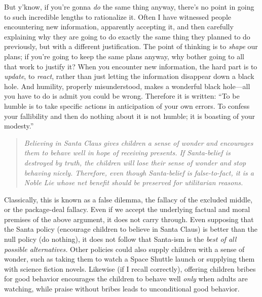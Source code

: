 {
 But y'know, if you're gonna
\textit{do} the same thing anyway, there's no point in
going to such incredible lengths to rationalize it. Often I have
witnessed people encountering new information, apparently accepting it,
and then carefully explaining why they are going to do exactly the same
thing they planned to do previously, but with a different
justification. The point of thinking is to \textit{shape} our plans; if
you're going to keep the same plans anyway, why bother
going to all that work to justify it? When you encounter new
information, the hard part is to \textit{update}, to \textit{react},
rather than just letting the information disappear down a black hole.
And humility, properly misunderstood, makes a wonderful black
hole---all you have to do is admit you could be wrong. Therefore it is
written: ``To be humble is to take specific actions in
anticipation of your own errors. To confess your fallibility and then
do nothing about it is not humble; it is boasting of your
modesty.''}

\myendsectiontext


\bigskip



\begin{quote}
{
 \textit{Believing in Santa Claus gives children a sense of wonder
and encourages them to behave well in hope of receiving presents. If
Santa-belief is destroyed by truth, the children will lose their sense
of wonder and stop behaving nicely. Therefore, even though Santa-belief
is false-to-fact, it is a Noble Lie whose net benefit should be
preserved for utilitarian reasons.}}
\end{quote}

{
 Classically, this is known as a false dilemma, the fallacy of the
excluded middle, or the package-deal fallacy. Even if we accept the
underlying factual and moral premises of the above argument, it does
not carry through. Even supposing that the Santa policy (encourage
children to believe in Santa Claus) is better than the null policy (do
nothing), it does not follow that Santa-ism is the \textit{best of all
possible alternatives.} Other policies could also supply children with
a sense of wonder, such as taking them to watch a Space Shuttle launch
or supplying them with science fiction novels. Likewise (if I recall
correctly), offering children bribes for good behavior encourages the
children to behave well \textit{only} when adults are watching, while
praise without bribes leads to unconditional good behavior.}

